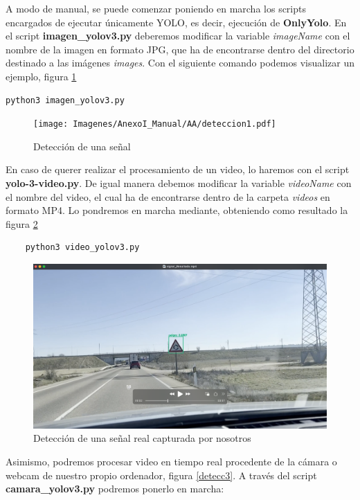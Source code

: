 A modo de manual, se puede comenzar poniendo en marcha los scripts encargados de ejecutar únicamente YOLO, es decir, ejecución de \textbf{OnlyYolo}. En el script \textbf{imagen_yolov3.py} deberemos modificar la variable \textit{imageName} con el nombre de la imagen en formato JPG, que ha de encontrarse dentro del directorio destinado a las imágenes \textit{images}. Con el siguiente comando podemos visualizar un ejemplo, figura \ref{detecc1} 

\begin{lstlisting}
python3 imagen_yolov3.py
\end{lstlisting}

\begin{figure}[H]
	\centering
	\texttt{[image: Imagenes/AnexoI\_Manual/AA/deteccion1.pdf]}
	\caption{Detección de una señal}
	\label{detecc1}
\end{figure}

En caso de querer realizar el procesamiento de un video, lo haremos con el script \textbf{yolo-3-video.py}. De igual manera debemos modificar la variable \textit{videoName} con el nombre del video, el cual ha de encontrarse dentro de la carpeta \textit{videos} en formato MP4. Lo pondremos en marcha mediante, obteniendo como resultado la figura \ref{detecc2}
\begin{lstlisting}
	python3 video_yolov3.py
\end{lstlisting}
	
\begin{figure}[H]
	\centering
	\includegraphics[width=\textwidth]{Imagenes/AnexoI_Manual/AA/deteccion2.pdf}
	\caption{Detección de una señal real capturada por nosotros}
	\label{detecc2}
\end{figure}

Asimismo, podremos procesar video en tiempo real procedente de la cámara o webcam de nuestro propio ordenador, figura \ref{detecc3}. A través del script \textbf{camara_yolov3.py} podremos ponerlo en marcha:

